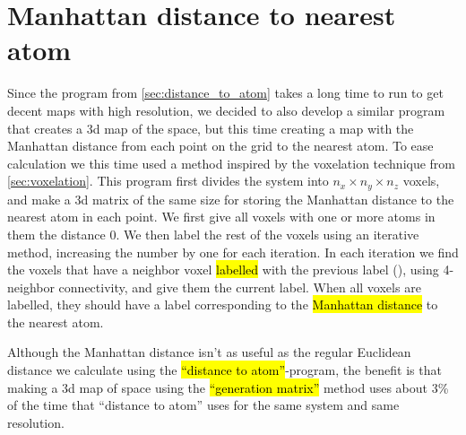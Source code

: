 \section{Manhattan distance to nearest atom\label{sec:generation_matrix}}
Since the program from \cref{sec:distance_to_atom} takes a long time to run to get decent maps with high resolution, we decided to also develop a similar program that creates a 3d map of the space, but this time creating a map with the Manhattan distance from each point on the grid to the nearest atom. To ease calculation we this time used a method inspired by the voxelation technique from \cref{sec:voxelation}. This program first divides the system into $n_x\times n_y\times n_z$ voxels, and make a 3d matrix of the same size for storing the Manhattan distance to the nearest atom in each point. We first give all voxels with one or more atoms in them the distance 0. We then label the rest of the voxels using an iterative method, increasing the number by one for each iteration. In each iteration we find the voxels that have a neighbor voxel \hl{labelled} with the previous label (), using 4-neighbor connectivity, and give them the current label. When all voxels are labelled, they should have a label corresponding to the \hl{Manhattan distance} to the nearest atom.

Although the Manhattan distance isn't as useful as the regular Euclidean distance we calculate using the \hl{``distance to atom''}-program, the benefit is that making a 3d map of space using the \hl{``generation matrix''} method uses about 3\% of the time that ``distance to atom'' uses for the same system and same resolution. 



%     
% 
